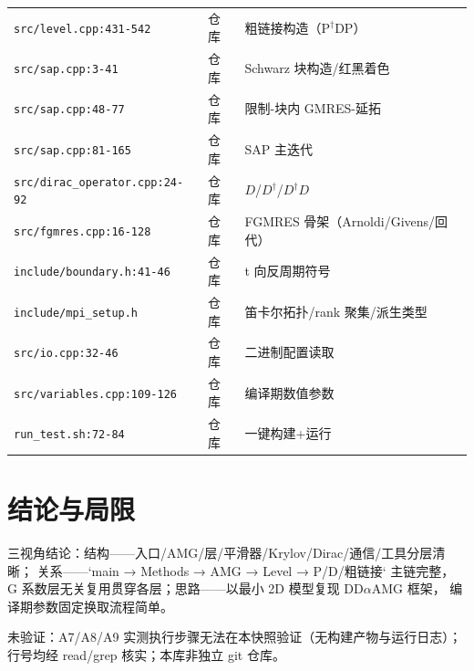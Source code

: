 \documentclass[UTF8]{ctexart}
\begin{document}
\begin{xltabular}{\textwidth}{lXX}
\texttt{\nolinkurl{src/level.cpp:431-542}} & 仓库 & 粗链接构造（P$^\dagger$DP）\\
\texttt{\nolinkurl{src/sap.cpp:3-41}} & 仓库 & Schwarz 块构造/红黑着色 \\
\texttt{\nolinkurl{src/sap.cpp:48-77}} & 仓库 & 限制-块内 GMRES-延拓 \\
\texttt{\nolinkurl{src/sap.cpp:81-165}} & 仓库 & SAP 主迭代 \\
\texttt{\nolinkurl{src/dirac_operator.cpp:24-92}} & 仓库 & $D$/$D^\dagger$/$D^\dagger D$ \\
\texttt{\nolinkurl{src/fgmres.cpp:16-128}} & 仓库 & FGMRES 骨架（Arnoldi/Givens/回代）\\
\texttt{\nolinkurl{include/boundary.h:41-46}} & 仓库 & t 向反周期符号 \\
\texttt{\nolinkurl{include/mpi_setup.h}} & 仓库 & 笛卡尔拓扑/rank 聚集/派生类型 \\
\texttt{\nolinkurl{src/io.cpp:32-46}} & 仓库 & 二进制配置读取 \\
\texttt{\nolinkurl{src/variables.cpp:109-126}} & 仓库 & 编译期数值参数 \\
\texttt{\nolinkurl{run_test.sh:72-84}} & 仓库 & 一键构建+运行 \\
\bottomrule
\end{xltabular}

\section{结论与局限}
\begin{conclbox}
三视角结论：\textcolor{struct}{结构}——入口/AMG/层/平滑器/Krylov/Dirac/通信/工具分层清晰；
\textcolor{relation}{关系}——`main → Methods → AMG → Level → P/D/粗链接` 主链完整，
G 系数层无关复用贯穿各层；\textcolor{idea}{思路}——以最小 2D 模型复现 DD$\alpha$AMG 框架，
编译期参数固定换取流程简单。
\end{conclbox}
\begin{warnbox}
\textcolor{warn}{未验证}：A7/A8/A9 实测执行步骤无法在本快照验证（无构建产物与运行日志）；
行号均经 read/grep 核实；本库非独立 git 仓库。
\end{warnbox}
\end{document}
